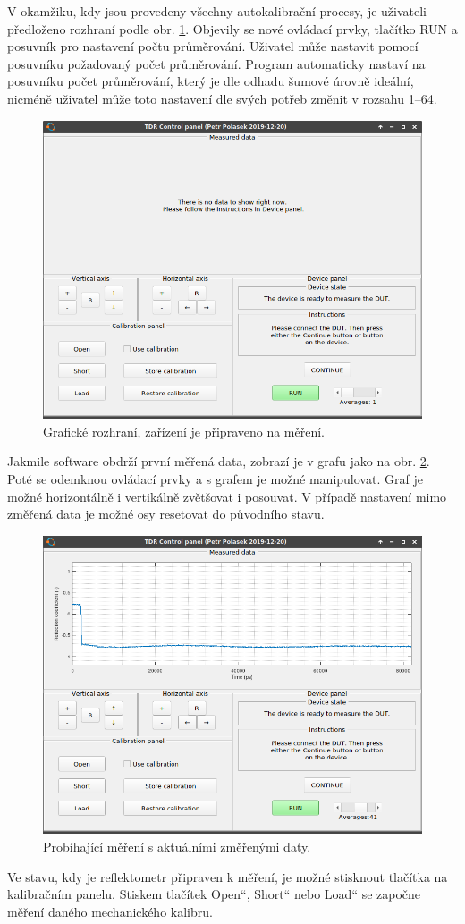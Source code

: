V okamžiku, kdy jsou provedeny všechny autokalibrační procesy, je uživateli předloženo rozhraní podle obr. \ref{dut_ready}. Objevily se nové ovládací prvky, tlačítko RUN a posuvník pro nastavení počtu průměrování. Uživatel může nastavit pomocí posuvníku požadovaný počet průměrování. Program automaticky nastaví na posuvníku počet průměrování, který je dle odhadu šumové úrovně ideální, nicméně uživatel může toto nastavení dle svých potřeb změnit v rozsahu \SIrange{1}{64}{}. 
\begin{figure}[htbp]
\includegraphics[width=\textwidth,keepaspectratio]{images/gui/dut_ready.png}\caption{Grafické rozhraní, zařízení je připraveno na měření.}\label{dut_ready}
\end{figure}

Jakmile software obdrží první měřená data, zobrazí je v grafu jako na obr. \ref{measured_data}. Poté se odemknou ovládací prvky a s grafem je možné manipulovat. Graf je možné horizontálně i vertikálně zvětšovat i posouvat. V případě nastavení mimo změřená data je možné osy resetovat do původního stavu.
\begin{figure}[htbp]
\includegraphics[width=\textwidth,keepaspectratio]{images/gui/measured_data.png}\caption{Probíhající měření s aktuálními změřenými daty.}\label{measured_data}
\end{figure}

Ve stavu, kdy je reflektometr připraven k měření, je možné stisknout tlačítka na kalibračním panelu. Stiskem tlačítek \quotedblbase Open\textquotedblleft, \quotedblbase Short\textquotedblleft{} nebo \quotedblbase Load\textquotedblleft{} se započne měření daného mechanického kalibru.